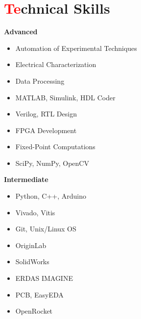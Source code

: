 \documentclass[a4paper, 11pt]{article}
\begin{document}
\section{{\textcolor{red}{Te}chnical Skills}}
\begin{center}
    \begin{minipage}[t]{0.45\textwidth}
        \textbf{Advanced}
        \vspace{-7pt}
        \begin{itemize}
            \setlength{\itemindent}{0em}
            \setlength{\itemsep}{-3pt}
            \item Automation of Experimental Techniques
            \item Electrical Characterization
            \item Data Processing
            \item MATLAB, Simulink, HDL Coder
            \item Verilog, RTL Design
            \item FPGA Development
            \item Fixed-Point Computations
            \item SciPy, NumPy, OpenCV
        \end{itemize}
    \end{minipage}%
    \hfill
    \begin{minipage}[t]{0.45\textwidth}
        \textbf{Intermediate}
        \vspace{-7pt}
        \begin{itemize}
            \setlength{\itemindent}{0em}
            \setlength{\itemsep}{-3pt}
            \item Python, C++, Arduino
            \item Vivado, Vitis
            \item Git, Unix/Linux OS
            \item OriginLab
            \item SolidWorks
            \item ERDAS IMAGINE
            \item PCB, EasyEDA
            \item OpenRocket
        \end{itemize}
    \end{minipage}
\end{center}
\vspace{-15pt}

\end{document}
